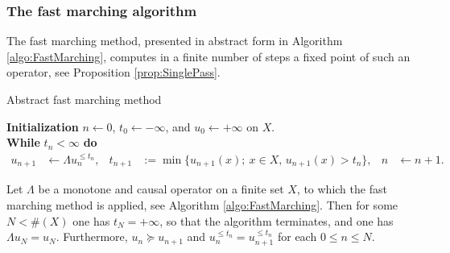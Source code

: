 \subsubsection{The fast marching algorithm}




The fast marching method, presented in abstract form in Algorithm \ref{algo:FastMarching}, computes in a finite number of steps a fixed point of such an operator, see Proposition \ref{prop:SinglePass}.

\begin{algorithm}
\caption{Abstract fast marching method}
\label{algo:FastMarching}
\textbf{Initialization } $n \gets 0$, $t_0 \gets -\infty$, and $u_0 \gets +\infty$ on $X$.\\
\textbf{While } $t_n< \infty$ \textbf{ do }
\begin{align*}
	u_{n+1} &\gets \Lambda u_n^{\leq t_n}, &
	t_{n+1} &:= \min\{ u_{n+1}(x);\ x \in X, \, u_{n+1}(x)> t_n\}, &
	n &\gets n+1.
\end{align*}
\end{algorithm}


\begin{proposition}
\label{prop:SinglePass}
	Let $\Lambda$ be a monotone and causal operator on a finite set $X$, to which the fast marching method is applied, see Algorithm \ref{algo:FastMarching}.
	Then for some $N< \#(X)$ one has $t_N = +\infty$, so that the algorithm terminates, and one has $\Lambda u_N = u_N$. Furthermore, $u_n \succeq u_{n+1}$ and $u_n^{\leq t_n} = u_{n+1}^{\leq t_n}$ for each $0 \leq n\leq N$.
\end{proposition}

